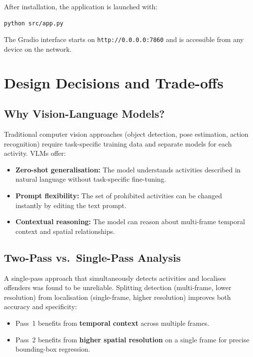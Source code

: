 \documentclass[12pt,a4paper]{article}
\begin{document}
After installation, the application is launched with:

\begin{lstlisting}[language=bash, numbers=none]
python src/app.py
\end{lstlisting}

The Gradio interface starts on \texttt{http://0.0.0.0:7860} and is accessible from any device on the network.

\section{Design Decisions and Trade-offs}

\subsection{Why Vision-Language Models?}

Traditional computer vision approaches (object detection, pose estimation, action recognition) require task-specific training data and separate models for each activity. VLMs offer:

\begin{itemize}[noitemsep]
    \item \textbf{Zero-shot generalisation:} The model understands activities described in natural language without task-specific fine-tuning.
    \item \textbf{Prompt flexibility:} The set of prohibited activities can be changed instantly by editing the text prompt.
    \item \textbf{Contextual reasoning:} The model can reason about multi-frame temporal context and spatial relationships.
\end{itemize}

\subsection{Two-Pass vs.\ Single-Pass Analysis}

A single-pass approach that simultaneously detects activities and localises offenders was found to be unreliable. Splitting detection (multi-frame, lower resolution) from localisation (single-frame, higher resolution) improves both accuracy and specificity:

\begin{itemize}[noitemsep]
    \item Pass~1 benefits from \textbf{temporal context} across multiple frames.
    \item Pass~2 benefits from \textbf{higher spatial resolution} on a single frame for precise bounding-box regression.
\end{itemize}
\end{document}
